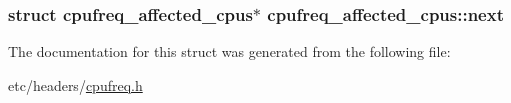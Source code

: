 \subsubsection[{\texorpdfstring{next}{next}}]{\setlength{\rightskip}{0pt plus 5cm}struct {\bf cpufreq\+\_\+affected\+\_\+cpus}$\ast$ cpufreq\+\_\+affected\+\_\+cpus\+::next}\hypertarget{structcpufreq__affected__cpus_ad811e7d6fb5d9f7e2c13558c3ba7d07f}{}\label{structcpufreq__affected__cpus_ad811e7d6fb5d9f7e2c13558c3ba7d07f}


The documentation for this struct was generated from the following file\+:\begin{DoxyCompactItemize}
\item 
etc/headers/\hyperlink{cpufreq_8h}{cpufreq.\+h}\end{DoxyCompactItemize}
